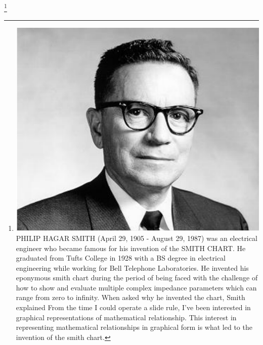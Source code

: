 \footnote{\includegraphics[scale=0.09]{./graphics/a21}PHILIP HAGAR SMITH (April 29, 1905 - August 29, 1987) was an electrical engineer who became famous for his invention of the SMITH CHART. He graduated from Tufts College in 1928 with a BS degree in electrical engineering while working for Bell Telephone Laboratories. He invented his eponymous smith chart during the period of being faced with the challenge of how to show and evaluate multiple complex impedance parameters which can range from zero to infinity. When asked why he invented the chart, Smith explained \textquotesingle\textquotesingle From the time I could operate a slide rule, I've been interested in graphical representations of mathematical relationship\textquotesingle\textquotesingle. This interest in representing mathematical relationships in graphical form is what led to the invention of the smith chart.}

